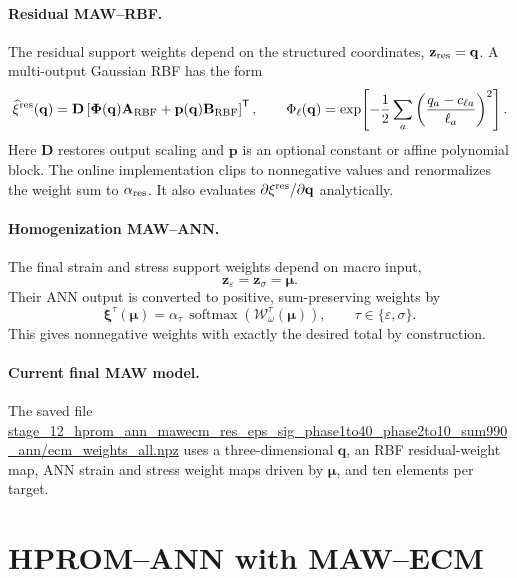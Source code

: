\documentclass[11pt,a4paper]{article}
\newcommand{\transpose}{^{\mathsf T}}
\newcommand{\vect}[1]{\mathbf{#1}}
\newcommand{\mat}[1]{\mathbf{#1}}
\newcommand{\code}[1]{\url{#1}}
\begin{document}
\paragraph{Residual MAW--RBF.}
The residual support weights depend on the structured coordinates,
\(\vect z_{\rm res}=\vect q\).  A multi-output Gaussian RBF has the form
\begin{equation}
  \widehat{\vect\xi}^{\rm res}(\vect q)
  =\mat D\left[
     \mat\Phi(\vect q)\mat A_{\rm RBF}+\mat p(\vect q)\mat B_{\rm RBF}
    \right]\transpose,
  \qquad
  \Phi_\ell(\vect q)
  =\exp\!\left[-\frac12
      \sum_a\left(\frac{q_a-c_{\ell a}}{\ell_a}\right)^2\right].
  \label{eq:maw-rbf}
\end{equation}
Here \(\mat D\) restores output scaling and \(\mat p\) is an optional
constant or affine polynomial block.  The online implementation clips to
nonnegative values and renormalizes the weight sum to \(\alpha_{\rm res}\).
It also evaluates \(\partial\vect\xi^{\rm res}/\partial\vect q\)
analytically.

\paragraph{Homogenization MAW--ANN.}
The final strain and stress support weights depend on macro input,
\begin{equation}
  \vect z_{\varepsilon}=\vect z_{\sigma}=\vect\mu.
  \label{eq:hom-weight-input}
\end{equation}
Their ANN output is converted to positive, sum-preserving weights by
\begin{equation}
  \vect\xi^\tau(\vect\mu)
  =\alpha_\tau\,\operatorname{softmax}
    \left(\mathcal W^\tau_\omega(\vect\mu)\right),
  \qquad \tau\in\{\varepsilon,\sigma\}.
  \label{eq:maw-ann}
\end{equation}
This gives nonnegative weights with exactly the desired total by construction.

\paragraph{Current final MAW model.}
The saved file
\code{stage_12_hprom_ann_mawecm_res_eps_sig_phase1to40_phase2to10_sum990_ann/ecm_weights_all.npz}
uses a three-dimensional \(\vect q\), an RBF residual-weight map, ANN strain
and stress weight maps driven by \(\vect\mu\), and ten elements per target.

\section{HPROM--ANN with MAW--ECM}
\label{sec:maw-hprom}
\end{document}
